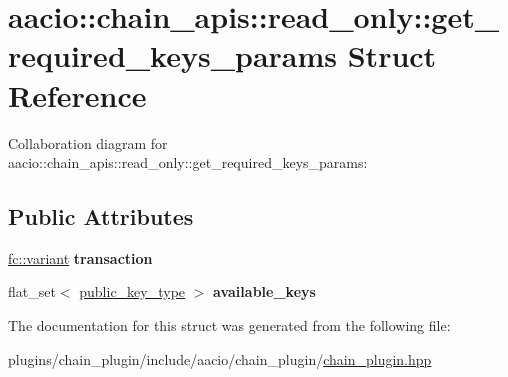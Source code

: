\hypertarget{structaacio_1_1chain__apis_1_1read__only_1_1get__required__keys__params}{}\section{aacio\+:\+:chain\+\_\+apis\+:\+:read\+\_\+only\+:\+:get\+\_\+required\+\_\+keys\+\_\+params Struct Reference}
\label{structaacio_1_1chain__apis_1_1read__only_1_1get__required__keys__params}


Collaboration diagram for aacio\+:\+:chain\+\_\+apis\+:\+:read\+\_\+only\+:\+:get\+\_\+required\+\_\+keys\+\_\+params\+:
\subsection*{Public Attributes}
\begin{DoxyCompactItemize}
\item 
\mbox{\label{structaacio_1_1chain__apis_1_1read__only_1_1get__required__keys__params_a4e5abcec3fe5f178e19e272e796e6a45}} 
\mbox{\hyperlink{classfc_1_1variant}{fc\+::variant}} {\bfseries transaction}
\item 
\mbox{\label{structaacio_1_1chain__apis_1_1read__only_1_1get__required__keys__params_adc90387fa08141341071c343372924fa}} 
flat\+\_\+set$<$ \mbox{\hyperlink{classfc_1_1crypto_1_1public__key}{public\+\_\+key\+\_\+type}} $>$ {\bfseries available\+\_\+keys}
\end{DoxyCompactItemize}


The documentation for this struct was generated from the following file\+:\begin{DoxyCompactItemize}
\item 
plugins/chain\+\_\+plugin/include/aacio/chain\+\_\+plugin/\mbox{\hyperlink{chain__plugin_8hpp}{chain\+\_\+plugin.\+hpp}}\end{DoxyCompactItemize}

